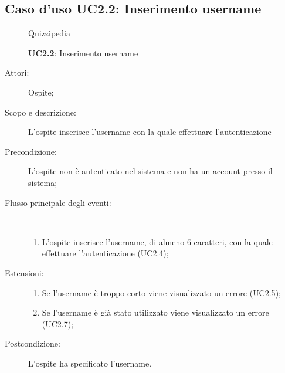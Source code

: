 \subsection{Caso d'uso UC2.2: Inserimento username}
\begin{figure}[H]
	\centering
	\begin{resizedtikzpicture}{\textwidth}
		\begin{umlsystem}[x=0, fill=lightgray!20]{Quizzipedia}
		\end{umlsystem}
	\end{resizedtikzpicture}
	\caption{\textbf{UC2.2}: Inserimento username}
	\label{UC2.2}
\end{figure}
\begin{description}
	\item[Attori:] Ospite;
	\item[Scopo e descrizione:] L'ospite inserisce l'username con la quale effettuare l'autenticazione
	\item[Precondizione:] L'ospite non è autenticato nel sistema e non ha un account presso il sistema;
	
	\item[Flusso principale degli eventi:] \ 
	\begin{enumerate}
		\item L'ospite inserisce l'username, di almeno 6 caratteri, con la quale effettuare l'autenticazione  (\hyperlink{UC2.4}{UC2.4});
		
	\end{enumerate}
	\item[Estensioni:]
	\begin{enumerate}
		\item Se l'username è troppo corto viene visualizzato un errore (\hyperlink{UC2.5}{UC2.5});
		\item Se l'username è già stato utilizzato viene visualizzato un errore (\hyperlink{UC2.7}{UC2.7});
		
	\end{enumerate}
	\item[Postcondizione:] L'ospite ha specificato l'username.
\end{description}
\hypertarget{UC2.3}{}
